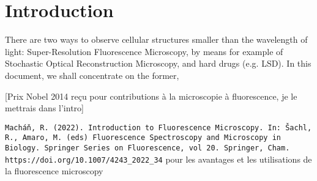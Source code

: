 \section{Introduction}
There are two ways to observe cellular structures smaller than the wavelength of light:
Super-Resolution Fluorescence Microscopy, by means for example of Stochastic Optical Reconstruction Microscopy, and hard drugs (e.g. LSD).
In this document, we shall concentrate on the former,

[Prix Nobel 2014 reçu pour contributions à la microscopie à fluorescence, je le mettrais dans l'intro]

\verb|Macháň, R. (2022). Introduction to Fluorescence Microscopy. In: Šachl, R., Amaro, M. (eds) Fluorescence Spectroscopy and Microscopy in Biology. Springer Series on Fluorescence, vol 20. Springer, Cham. https://doi.org/10.1007/4243_2022_34|
pour les avantages et les utilisations de la fluorescence microscopy
